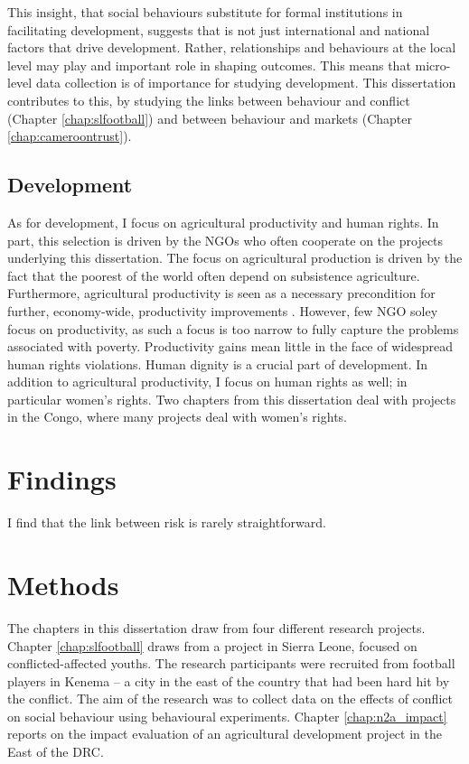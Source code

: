 This insight, that social behaviours substitute for formal institutions in facilitating development, suggests that is not just international and national factors that drive development. Rather, relationships and behaviours at the local level may play and important role in shaping outcomes. This means that micro-level data collection is of importance for studying development. This dissertation contributes to this, by studying the links between behaviour and conflict (Chapter \ref{chap:slfootball}) and between behaviour and markets (Chapter \ref{chap:cameroontrust}).

\subsection{Development}
As for development, I focus on agricultural productivity and human rights. In part, this selection is driven by the NGOs who often cooperate on the projects underlying this dissertation. The focus on agricultural production is driven by the fact that the poorest of the world often depend on subsistence agriculture. Furthermore, agricultural productivity is seen as a necessary precondition for further, economy-wide, productivity improvements \citep{WorldBank2008}. However, few NGO soley focus on productivity, as such a focus is too narrow to fully capture the problems associated with poverty. Productivity gains mean little in the face of widespread human rights violations. Human dignity is a crucial part of development. In addition to agricultural productivity, I focus on human rights as well; in particular women's rights. Two chapters from this dissertation deal with projects in the Congo, where many projects deal with women's rights.


\section{Findings}
I find that the link between risk is rarely straightforward.

\section{Methods}
The chapters in this dissertation draw from four different research projects. Chapter \ref{chap:slfootball} draws from a project in Sierra Leone, focused on conflicted-affected youths. The research participants were recruited from football players in Kenema -- a city in the east of the country that had been hard hit by the conflict. The aim of the research was to collect data on the effects of conflict on social behaviour using behavioural experiments. Chapter \ref{chap:n2a_impact} reports on the impact evaluation of an agricultural development project in the East of the DRC. 

